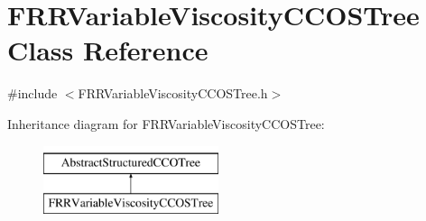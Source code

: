 \hypertarget{class_f_r_r_variable_viscosity_c_c_o_s_tree}{}\section{F\+R\+R\+Variable\+Viscosity\+C\+C\+O\+S\+Tree Class Reference}
\label{class_f_r_r_variable_viscosity_c_c_o_s_tree}


{\ttfamily \#include $<$F\+R\+R\+Variable\+Viscosity\+C\+C\+O\+S\+Tree.\+h$>$}

Inheritance diagram for F\+R\+R\+Variable\+Viscosity\+C\+C\+O\+S\+Tree\+:\begin{figure}[H]
\begin{center}
\leavevmode
\includegraphics[height=2.000000cm]{da/df3/class_f_r_r_variable_viscosity_c_c_o_s_tree}
\end{center}
\end{figure}
